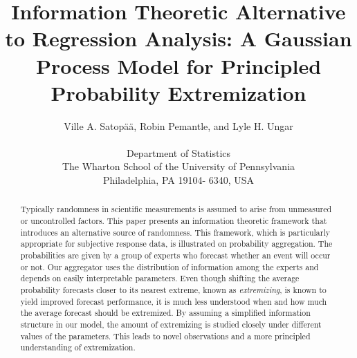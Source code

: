\documentclass[11pt,twoside]{article}
\begin{document}
\title{Information Theoretic Alternative to Regression Analysis: A Gaussian Process Model for Principled Probability Extremization}
\author{
Ville A. Satop\"a\"a, Robin Pemantle, and Lyle H. Ungar\\
\\
 \small Department of Statistics\\
 \small The Wharton School of the University of Pennsylvania\\
 \small Philadelphia, PA 19104- 6340, USA\\ [-0.25in]} \date{}
\maketitle

\pagestyle{myheadings}
\thispagestyle{empty}

\begin{abstract}
Typically randomness in scientific measurements is assumed to arise from unmeasured or uncontrolled factors. This paper presents an information theoretic framework that introduces an alternative source of randomness. This framework, which is particularly appropriate for subjective response data, is illustrated on probability aggregation. The probabilities are given by a group of experts who forecast whether an event will occur or not. Our aggregator uses the distribution of information among the experts and depends on easily interpretable parameters. Even though shifting the average probability forecasts closer to its nearest extreme, known as \textit{extremizing}, is known to yield improved forecast performance, it is much less understood when and how much the average forecast should be extremized. By assuming a simplified information structure in our model, the amount of extremizing is studied closely under different values of  the parameters. This leads to novel observations and a more principled understanding of extremization.
\end{abstract}

\end{document}
